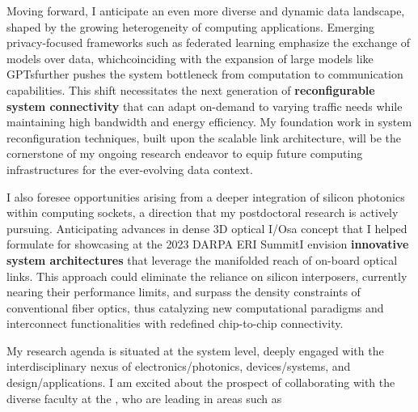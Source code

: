 Moving forward, I anticipate an even more diverse and dynamic data landscape, shaped by the growing heterogeneity of computing applications. Emerging privacy-focused frameworks such as federated learning emphasize the exchange of models over data, which\textemdash coinciding with the expansion of large models like GPTs\textemdash further pushes the system bottleneck from computation to communication capabilities. This shift necessitates the next generation of \textbf{reconfigurable system connectivity} that can adapt on-demand to varying traffic needs while maintaining high bandwidth and energy efficiency. My foundation work in system reconfiguration techniques, built upon the scalable link architecture, will be the cornerstone of my ongoing research endeavor to equip future computing infrastructures for the ever-evolving data context.

I also foresee opportunities arising from a deeper integration of silicon photonics within computing sockets, a direction that my postdoctoral research is actively pursuing. Anticipating advances in dense 3D optical I/Os\textemdash a concept that I helped formulate for showcasing at the 2023 DARPA ERI Summit\textemdash I envision \textbf{innovative system architectures} that leverage the manifolded reach of on-board optical links. This approach could eliminate the reliance on silicon interposers, currently nearing their performance limits, and surpass the density constraints of conventional fiber optics, thus catalyzing new computational paradigms and interconnect functionalities with redefined chip-to-chip connectivity.

My research agenda is situated at the system level, deeply engaged with the interdisciplinary nexus of electronics/photonics, devices/systems, and design/applications. I am excited about the prospect of collaborating with the diverse faculty at the \appSchool{}, who are leading in areas such as%